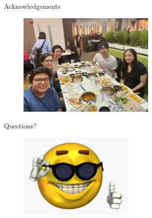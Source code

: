 \documentclass[xcolor=dvipsnames]{beamer}
\begin{document}
\begin{frame}{Acknowledgements}
\begin{figure}
\begin{minipage}{0.3\textwidth}
    \end{minipage}
    \begin{minipage}{0.5\textwidth}
      \centering
      \includegraphics[width=0.6\textwidth]{yelingroup.jpg}
  \end{minipage}
\end{figure}

\end{frame}

\begin{frame}{Questions?}

  \begin{figure}
    \centering
    \includegraphics[width=0.5\textwidth]{thumbsup.png}
  \end{figure}

\end{frame}
\end{document}
